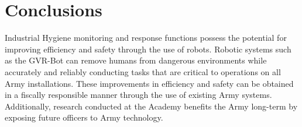 \section{Conclusions}\label{conclusions}
Industrial Hygiene monitoring and response functions possess the potential for improving efficiency and safety through the use of robots. Robotic systems such as the GVR-Bot can remove humans from dangerous environments while accurately and reliably conducting tasks that are critical to operations on all Army installations. These improvements in efficiency and safety can be obtained in a fiscally responsible manner through the use of existing Army systems. Additionally, research conducted at the Academy benefits the Army long-term by exposing future officers to Army technology.%
